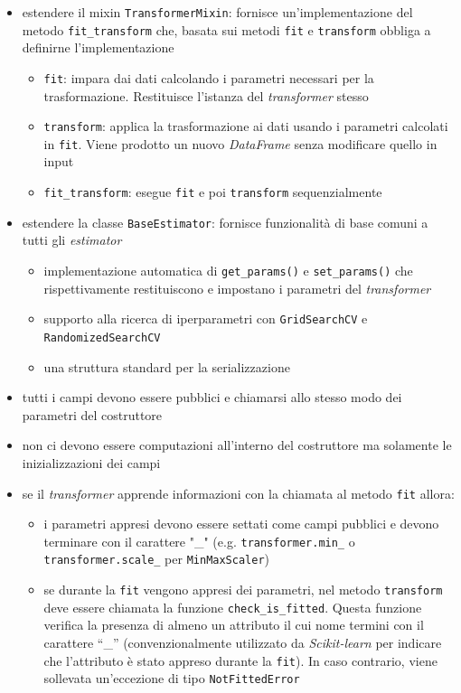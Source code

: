 \begin{itemize}
    \item estendere il mixin \texttt{TransformerMixin}: fornisce un'implementazione del metodo \texttt{fit\_transform} che, basata sui metodi \texttt{fit} e \texttt{transform} obbliga a definirne l'implementazione
    \begin{itemize}
        \item \texttt{fit}: impara dai dati calcolando i parametri necessari per la trasformazione. Restituisce l'istanza del \textit{transformer} stesso
        \item \texttt{transform}: applica la trasformazione ai dati usando i parametri calcolati in \texttt{fit}. Viene prodotto un nuovo \textit{DataFrame} senza modificare quello in input
        \item \texttt{fit\_transform}: esegue \texttt{fit} e poi \texttt{transform} sequenzialmente
    \end{itemize}
    \item estendere la classe \texttt{BaseEstimator}: fornisce funzionalità di base comuni a tutti gli \textit{estimator}
    \begin{itemize}
        \item implementazione automatica di \texttt{get\_params()} e \texttt{set\_params()} che rispettivamente restituiscono e impostano i parametri del \textit{transformer}
        \item supporto alla ricerca di iperparametri con \texttt{GridSearchCV} e \\ \texttt{RandomizedSearchCV}
        \item una struttura standard per la serializzazione
    \end{itemize}
    \item tutti i campi devono essere pubblici e chiamarsi allo stesso modo dei parametri del costruttore
    \item non ci devono essere computazioni all'interno del costruttore ma solamente le inizializzazioni dei campi
    \item se il \textit{transformer} apprende informazioni con la chiamata al metodo \texttt{fit} allora:
    \begin{itemize}
        \item i parametri appresi devono essere settati come campi pubblici e devono terminare con il carattere "\_" (e.g. \texttt{transformer.min\_} o \\ \texttt{transformer.scale\_} per \texttt{MinMaxScaler})
        \item se durante la \texttt{fit} vengono appresi dei parametri, nel metodo \texttt{transform} deve essere chiamata la funzione \texttt{check\_is\_fitted}. Questa funzione verifica la presenza di almeno un attributo il cui nome termini con il carattere ``\_'' (convenzionalmente utilizzato da \textit{Scikit-learn} per indicare che l'attributo è stato appreso durante la \texttt{fit}). In caso contrario, viene sollevata un'eccezione di tipo \texttt{NotFittedError}
    \end{itemize} 
\end{itemize}

